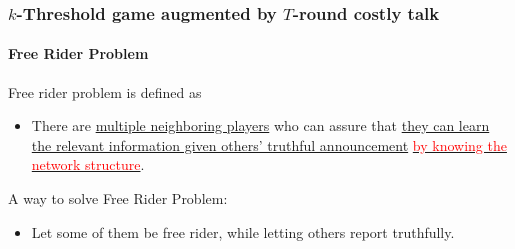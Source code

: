 \documentclass[9pt]{beamer}
\begin{document}
\begin{frame}
  \frametitle{$k$-Threshold game augmented by $T$-round costly talk}
  \framesubtitle{Free Rider Problem}

Free rider problem is defined as 
\begin{itemize}
\item There are \underline{multiple neighboring players} who can assure that \underline{they can learn the relevant information given others' truthful announcement} \underline{\textcolor{red}{by knowing the network structure}}. 
\end{itemize}

A way to solve Free Rider Problem:

\begin{itemize}
\item Let some of them be free rider, while letting others report truthfully.
\end{itemize}


\end{frame}
\end{document}
